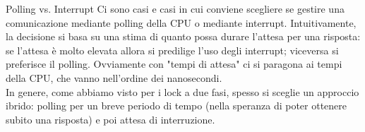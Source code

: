 \documentclass[12pt]{report}
\begin{document}
	\begin{osservazione}{Polling vs. Interrupt}{}
		Ci sono casi e casi in cui conviene scegliere se gestire una comunicazione mediante polling della CPU o mediante interrupt. Intuitivamente, la decisione si basa su una stima di quanto possa durare l'attesa per una risposta: se l'attesa è molto elevata allora si predilige l'uso degli interrupt; viceversa si preferisce il polling. Ovviamente con "tempi di attesa" ci si paragona ai tempi della CPU, che vanno nell'ordine dei nanosecondi.\\
		In genere, come abbiamo visto per i lock a due fasi, spesso si sceglie un approccio ibrido: polling per un breve periodo di tempo (nella speranza di poter ottenere subito una risposta) e poi attesa di interruzione.
	\end{osservazione}
	
\end{document}
